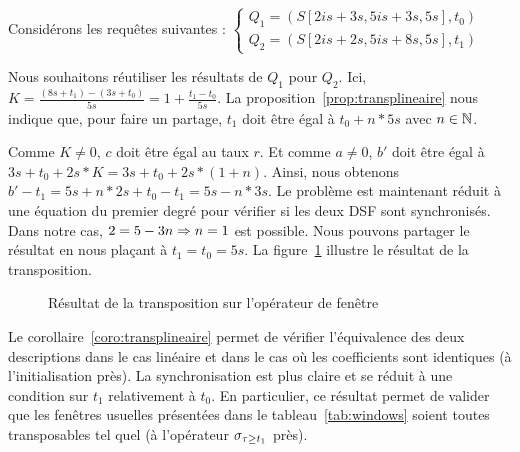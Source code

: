 \begin{example}
    Considérons les requêtes suivantes : $\left\{\begin{array}{l} Q_1=(S[2is+3s, 5is+3s, 5s],t_0)  \\ Q_2=(S[2is+2s, 5is+8s, 5s],t_1) \end{array}\right.$

    Nous souhaitons réutiliser les résultats de $Q_1$ pour $Q_2$. Ici, $K = \frac{(8s+t_1)-(3s+t_0)}{5s} =1+\frac{t_1-t_0}{5s}$. La proposition~\ref{prop:transplineaire} nous indique que, pour faire un partage, $t_1$ doit être égal à $t_0 + n*5s$ avec $n\in \mathbb{N}$.

    Comme $K\neq 0$, $c$ doit être égal au taux $r$. Et comme $a \neq 0$, $b'$ doit être égal à $3s+t_0+2s*K = 3s+t_0+2s*(1+n)$. Ainsi, nous obtenons $b'-t_1 = 5s+n*2s+t_0-t_1 = 5s-n*3s$. Le problème est maintenant réduit à une équation du premier degré pour vérifier si les deux DSF sont synchronisés. Dans notre cas, $2 = 5-3n \Rightarrow n=1$ est possible. Nous pouvons partager le résultat en nous plaçant à $t_1 = t_0 = 5s$. La figure~\ref{fig:valid:expressivite:transplineaire} illustre le résultat de la transposition.
\begin{figure}[ht]
\def\lgrad#1{\draw [thick] (#1,0) -- (#1,-0.2); \node [below] at (#1,-0.2){#1};}
\def\seg#1#2#3#4#5{\draw [thick] (#1#40.2,#3+0.25) -- (#1,#3+0.25) -- (#1,#3-0.25) -- (#1#40.2,#3-0.25); \draw [thick] (#1,#3) -- (#2,#3); \draw [thick] (#2#50.2,#3+0.25) -- (#2,#3+0.25) -- (#2,#3-0.25) -- (#2#50.2,#3-0.25);}
\centering
{}
\caption{Résultat de la transposition sur l'opérateur de fenêtre}\label{fig:valid:expressivite:transplineaire}
\end{figure}
\end{example}

Le corollaire~\ref{coro:transplineaire} permet de vérifier l'équivalence des deux descriptions dans le cas linéaire et dans le cas où les coefficients sont identiques (à l'initialisation près). 
La synchronisation est plus claire et se réduit à une condition sur $t_1$ relativement à $t_0$. En particulier, ce résultat permet de valider que les fenêtres usuelles présentées dans le tableau~\ref{tab:windows} soient toutes transposables tel quel (à l'opérateur $\sigma_{\tau\geq t_1}$ près).